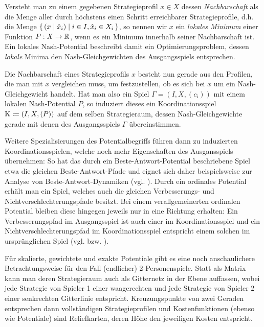 Versteht man zu einem gegebenen Strategieprofil $x \in X$ dessen \emph{Nachbarschaft} als die Menge aller durch höchstens einen Schritt erreichbarer Strategieprofile, d.h. die Menge $\set{(x \mid \hat{x}_i) | i \in I, \hat{x}_i \in X_i}$, so nennen wir $x$ ein \emph{lokales Minimum} einer Funktion $P: X \to \mathbb{R}$, wenn es ein Minimum innerhalb seiner Nachbarschaft ist. Ein lokales Nash-Potential beschreibt damit ein Optimierungsproblem, dessen \emph{lokale} Minima den Nash-Gleichgewichten des Ausgangsspiels entsprechen.

Die Nachbarschaft eines Strategieprofils $x$ besteht nun gerade aus den Profilen, die man mit $x$ vergleichen muss, um festzustellen, ob es sich bei $x$ um ein Nash-Gleichgewicht handelt. Hat man also ein Spiel $\Gamma = (I, X, (c_i))$ mit einem lokalen Nash-Potential $P$, so induziert dieses ein Koordinationsspiel $\mathrm{K} \coloneqq (I, X, (P))$ auf dem selben Strategieraum, dessen Nash-Gleichgewichte gerade mit denen des Ausgangsspiels $\Gamma$ übereinstimmen.

Weitere Spezialisierungen des Potentialbegriffs führen dann zu induzierten Koordinationsspielen, welche noch mehr Eigenschaften des Ausgansspiels übernehmen: So hat das durch ein Beste-Antwort-Potential beschriebene Spiel etwa die gleichen Beste-Antwort-Pfade und eignet sich daher beispielsweise zur Analyse von Beste-Antwort-Dynamiken (vgl. ). Durch ein ordinales Potential erhält man ein Spiel, welches auch die gleichen Verbesserungs- und Nichtverschlechterungspfade besitzt. Bei einem verallgemeinerten ordinalen Potential bleiben diese hingegen jeweils nur in eine Richtung erhalten: Ein Verbesserungspfad im Ausgangsspiel ist auch einer im Koordinationsspiel und ein Nichtverschlechterungspfad im Koordinationsspiel entspricht einem solchen im ursprünglichen Spiel (vgl.  bzw. ).

Für skalierte, gewichtete und exakte Potentiale gibt es eine noch anschaulichere Betrachtungsweise für den Fall (endlicher) 2-Personenspiele. Statt als Matrix kann man deren Strategieraum auch als Gitternetz in der Ebene auffassen, wobei jede Strategie von Spieler 1 einer waagerechten und jede Strategie von Spieler 2 einer senkrechten Gitterlinie entspricht. Kreuzungspunkte von zwei Geraden entsprechen dann vollständigen Strategieprofilen und Kostenfunktionen (ebenso wie Potentiale) sind \glqq Reliefkarten\grqq{}, deren Höhe den jeweiligen Kosten entspricht. 

